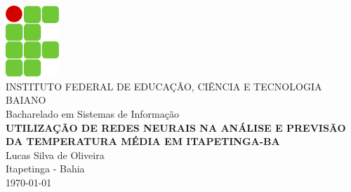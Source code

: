 \documentclass[12pt, openright, a4paper, brazil, oneside]{abntex2}
\begin{document}
    \begin{capa}
        \center
        \includegraphics[width=2cm]{template/ifbaiano.png}\\[0.2cm]
        {\ABNTEXchapterfont\LARGE INSTITUTO FEDERAL DE EDUCAÇÃO, CIÊNCIA E TECNOLOGIA BAIANO}\\[0.2cm]
        {\ABNTEXchapterfont\LARGE Bacharelado em Sistemas de Informação} \\[4cm]

        {\ABNTEXchapterfont\bfseries\LARGE UTILIZAÇÃO DE REDES NEURAIS NA ANÁLISE E PREVISÃO DA TEMPERATURA MÉDIA EM ITAPETINGA-BA}\\[4cm]

        {\ABNTEXchapterfont\large Lucas Silva de Oliveira}\\[4cm]

        \vfill
        \large Itapetinga - Bahia\\
        \today
    \end{capa}
\end{document}
